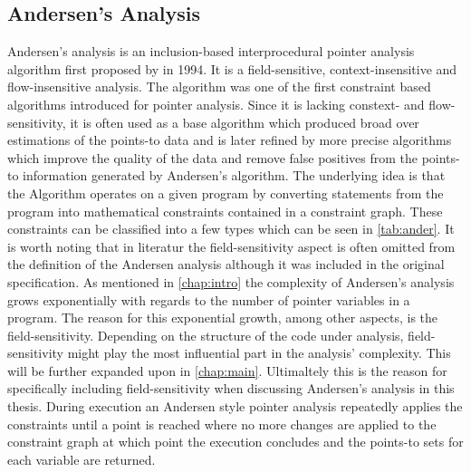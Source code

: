 \subsection{Andersen's Analysis}\label{sec:ander}
Andersen's analysis is an inclusion-based interprocedural pointer analysis algorithm first proposed by \cite{andersen1994program} in 1994. It is a field-sensitive, context-insensitive and flow-insensitive analysis. 
The algorithm was one of the first constraint based algorithms introduced for pointer analysis. Since it is lacking constext- and flow-sensitivity, it is often used as a base algorithm which produced broad over estimations of the points-to data and is later refined by more precise algorithms which improve the quality of the data and remove false positives from the points-to information generated by Andersen's algorithm.
The underlying idea is that the Algorithm operates on a given program by converting statements from the program into mathematical constraints contained in a constraint graph.
These constraints can be classified into a few types which can be seen in \autoref{tab:ander}.
It is worth noting that in literatur the field-sensitivity aspect is often omitted from the definition of the Andersen analysis although it was included in the original specification.
As mentioned in \autoref{chap:intro} the complexity of Andersen's analysis grows exponentially with regards to the number of pointer variables in a program. The reason for this exponential growth, among other aspects, is the field-sensitivity. Depending on the structure of the code under analysis, field-sensitivity might play the most influential part in the analysis' complexity. This will be further expanded upon in \autoref{chap:main}. Ultimaltely this is the reason for specifically including field-sensitivity when discussing Andersen's analysis in this thesis.
During execution an Andersen style pointer analysis repeatedly applies the constraints until a point is reached where no more changes are applied to the constraint graph at which point the execution concludes and the points-to sets for each variable are returned.
